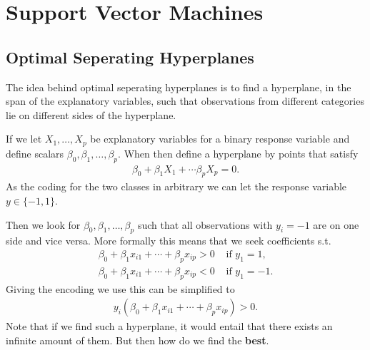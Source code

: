 \documentclass[aspectratio=169,10pt]{beamer}
\begin{document}
\section{Support Vector Machines}

\subsection{Optimal Seperating Hyperplanes}
\begin{frame}{\secname}{\subsecname}
  The idea behind optimal seperating hyperplanes is to find a hyperplane, in the span of the explanatory variables, such that observations from different categories lie on different sides of the hyperplane.

  If we let $X_1, \ldots, X_p$ be explanatory variables for a binary response variable and define scalars $\beta_0, \beta_1, \ldots, \beta_p$.
  When then define a hyperplane by points that satisfy
  \begin{align}
    \beta_0 + \beta_1 X_1 + \cdots \beta_pX_p = 0. 
  \end{align}
  As the coding for the two classes in arbitrary we can let the response variable $y \in \{-1,1\}$.
\end{frame}

\begin{frame}{\secname}{\subsecname}
  Then we look for $\beta_0, \beta_1, \ldots, \beta_p$ such that all observations with $y_i = -1$ are on one side and vice versa.
  More formally this means that we seek coefficients s.t.
  \begin{align}
    \beta_0 + \beta_1x_{i1} + \cdots + \beta_p x_{ip} > 0 &\text{ if } y_1 = 1, \\
    \beta_0 + \beta_1x_{i1} + \cdots + \beta_p x_{ip} < 0 &\text{ if } y_1 = -1. 
  \end{align}
  Giving the encoding we use this can be simplified to
  \begin{align}
    y_i \left(\beta_0 + \beta_1 x_{i1} + \cdots + \beta_p x_{ip}\right) > 0. 
  \end{align}
  Note that if we find such a hyperplane, it would entail that there exists an infinite amount of them.
  But then how do we find the \textbf{best}.
\end{frame}
\end{document}
